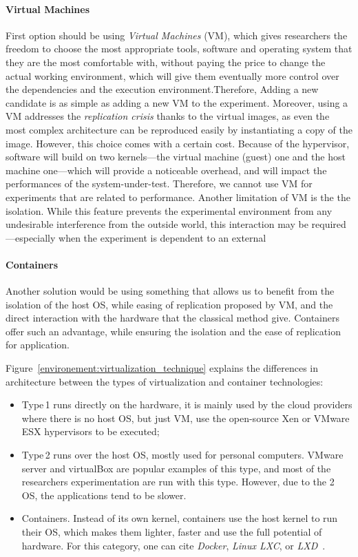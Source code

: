 \paragraph{Virtual Machines}
First option should be using \emph{Virtual Machines} (VM), which gives researchers the freedom to choose the most appropriate tools, software and operating system that they are the most comfortable with, without paying the price to change the actual working environment, which will give them eventually more control over the dependencies and the execution environment.Therefore, Adding a new candidate is as simple as adding a new VM to the experiment.
Moreover, using a VM addresses the \emph{replication crisis} thanks to the virtual images, as even the most complex architecture can be reproduced easily by instantiating a copy of the image. 
However, this choice comes with a certain cost.
Because of the hypervisor, software will build on two kernels---the virtual machine (guest) one and the host machine one---which will provide a noticeable overhead, and will impact the performances of the system-under-test.
Therefore, we cannot use VM for experiments that are related to performance.
Another limitation of VM is the the isolation.
While this feature prevents the experimental environment from any undesirable interference from the outside world, this interaction may be required---especially when the experiment is dependent to an external 

\paragraph{Containers}
Another solution would be using something that allows us to benefit from the isolation of the host OS, while easing of replication proposed by VM, and the direct interaction with the hardware that the classical method give.
Containers offer such an advantage, while ensuring the isolation and the ease of replication for application.

Figure~\ref{environement:virtualization_technique} explains the differences in architecture between the types of virtualization and container technologies:
\begin{itemize}
    \item \textsf{Type\,1} runs directly on the hardware, it is mainly used by the cloud providers where there is no host OS, but just VM, use the open-source Xen or VMware ESX hypervisors to be executed;
    \item \textsf{Type\,2} runs over the host OS, mostly used for personal computers.
    VMware server and virtualBox are popular examples of this type, and most of the researchers experimentation are run with this type. However, due to the 2 OS, the applications tend to be slower.
    \item \textsf{Containers}. Instead of its own kernel, containers use the host kernel to run their OS, which makes them lighter, faster and use the full potential of hardware.
    For this category, one can cite \emph{Docker}, \emph{Linux LXC}, or \emph{LXD}~\cite{abuabdo_virtualization_2019}.
\end{itemize}


